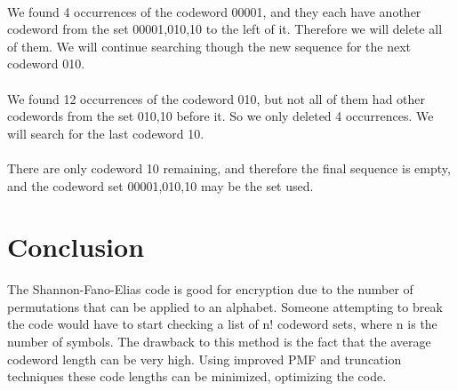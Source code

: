 \documentclass[10pt,letterpaper,notitlepage,draft]{article}
\theoremstyle{definition}
\begin{document}
\\


We found 4 occurrences of the codeword 00001, and they each have another codeword from the set {00001,010,10} to the left of it. 
Therefore we will delete all of them. 
We will continue searching though the new sequence for the next codeword 010.\\

\\

We found 12 occurrences of the codeword 010, but not all of them had other codewords from the set {010,10} before it. 
So we only deleted 4 occurrences.
We will search for the last codeword 10.\\

\\

There are only codeword 10 remaining, and therefore the final sequence is empty, and the codeword set {00001,010,10} may be the set used.

\section{Conclusion}
The Shannon-Fano-Elias code is good for encryption due to the number of permutations that can be applied to an alphabet. Someone attempting to break the code would have to start checking a list of n! codeword sets, where n is the number of symbols. The drawback to this method is the fact that the average codeword length can be very high. Using improved PMF and truncation techniques these code lengths can be minimized, optimizing the code.  
\nocite{*}

%
% 

\end{document}

